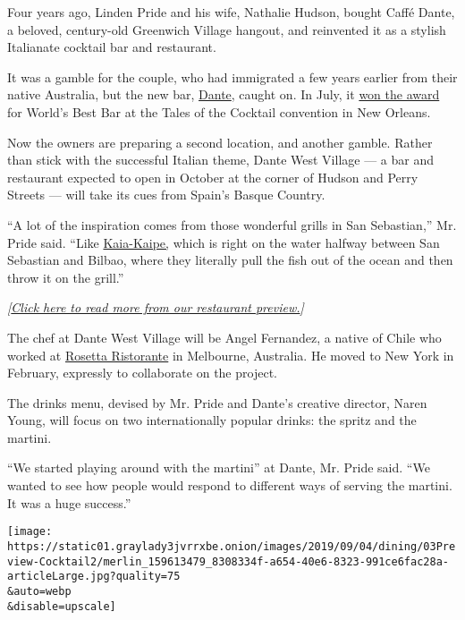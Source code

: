 Four years ago, Linden Pride and his wife, Nathalie Hudson, bought Caffé
Dante, a beloved, century-old Greenwich Village hangout, and reinvented
it as a stylish Italianate cocktail bar and restaurant.

It was a gamble for the couple, who had immigrated a few years earlier
from their native Australia, but the new bar,
\href{http://www.dante-nyc.com/}{Dante}, caught on. In July, it
\href{https://www.forbes.com/sites/karlaalindahao/2019/07/20/worlds-best-bar-2019-dante-new-york-wins-top-spot-at-the-13th-annual-spirited-awards/\#7c93e13f4ceb}{won
the award} for World's Best Bar at the Tales of the Cocktail convention
in New Orleans.

Now the owners are preparing a second location, and another gamble.
Rather than stick with the successful Italian theme, Dante West Village
--- a bar and restaurant expected to open in October at the corner of
Hudson and Perry Streets --- will take its cues from Spain's Basque
Country.

``A lot of the inspiration comes from those wonderful grills in San
Sebastian,'' Mr. Pride said. ``Like
\href{http://www.kaia-kaipe.com/}{Kaia-Kaipe,} which is right on the
water halfway between San Sebastian and Bilbao, where they literally
pull the fish out of the ocean and then throw it on the grill.''

\emph{{[}}\href{https://www.nytimes3xbfgragh.onion/2019/09/03/dining/fall-restaurant-preview-nyc.html}{\emph{Click
here to read more from our restaurant preview.}}\emph{{]}}

The chef at Dante West Village will be Angel Fernandez, a native of
Chile who worked at
\href{http://www.rosettarestaurant.com.au/home/ristorante-melbourne/}{Rosetta
Ristorante} in Melbourne, Australia. He moved to New York in February,
expressly to collaborate on the project.

The drinks menu, devised by Mr. Pride and Dante's creative director,
Naren Young, will focus on two internationally popular drinks: the
spritz and the martini.

``We started playing around with the martini'' at Dante, Mr. Pride said.
``We wanted to see how people would respond to different ways of serving
the martini. It was a huge success.''

\texttt{[image: https://static01.graylady3jvrrxbe.onion/images/2019/09/04/dining/03Preview-Cocktail2/merlin\_159613479\_8308334f-a654-40e6-8323-991ce6fac28a-articleLarge.jpg?quality=75\\\&auto=webp\\\&disable=upscale]}

